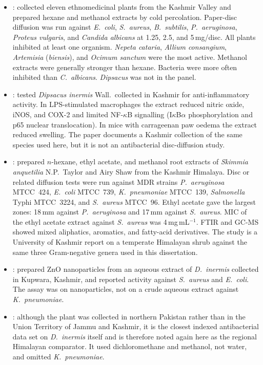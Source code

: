 \begin{itemize}

\item \citet{guna2018}: collected eleven ethnomedicinal plants from the Kashmir Valley and prepared hexane and methanol extracts by cold percolation. Paper-disc diffusion was run against \textit{E.\ coli}, \textit{S.\ aureus}, \textit{B.\ subtilis}, \textit{P.\ aeruginosa}, \textit{Proteus vulgaris}, and \textit{Candida albicans} at 1.25, 2.5, and 5\,mg/disc. All plants inhibited at least one organism. \textit{Nepeta cataria}, \textit{Allium consangium}, \textit{Artemisia} (\textit{biensis}), and \textit{Ocimum sanctum} were the most active. Methanol extracts were generally stronger than hexane. Bacteria were more often inhibited than \textit{C.\ albicans}. \textit{Dipsacus} was not in the panel.

\item \citet{hassan2020}: tested \textit{Dipsacus inermis} Wall.\ collected in Kashmir for anti-inflammatory activity. In LPS-stimulated macrophages the extract reduced nitric oxide, iNOS, and COX-2 and limited NF-$\kappa$B signalling (I$\kappa$B$\alpha$ phosphorylation and p65 nuclear translocation). In mice with carrageenan paw oedema the extract reduced swelling. The paper documents a Kashmir collection of the same species used here, but it is not an antibacterial disc-diffusion study.

\item \citet{nabi2022}: prepared $n$-hexane, ethyl acetate, and methanol root extracts of \textit{Skimmia anquetilia} N.P.\ Taylor and Airy Shaw from the Kashmir Himalaya. Disc or related diffusion tests were run against MDR strains \textit{P.\ aeruginosa} MTCC~424, \textit{E.\ coli} MTCC~739, \textit{K.\ pneumoniae} MTCC~139, \textit{Salmonella} Typhi MTCC~3224, and \textit{S.\ aureus} MTCC~96. Ethyl acetate gave the largest zones: 18\,mm against \textit{P.\ aeruginosa} and 17\,mm against \textit{S.\ aureus}. MIC of the ethyl acetate extract against \textit{S.\ aureus} was 4\,mg\,mL$^{-1}$. FTIR and GC-MS showed mixed aliphatics, aromatics, and fatty-acid derivatives. The study is a University of Kashmir report on a temperate Himalayan shrub against the same three Gram-negative genera used in this dissertation.

\item \citet{ji2026}: prepared ZnO nanoparticles from an aqueous extract of \textit{D.\ inermis} collected in Kupwara, Kashmir, and reported activity against \textit{S.\ aureus} and \textit{E.\ coli}. The assay was on nanoparticles, not on a crude aqueous extract against \textit{K.\ pneumoniae}.

\item \citet{drakhshaan2026}: although the plant was collected in northern Pakistan rather than in the Union Territory of Jammu and Kashmir, it is the closest indexed antibacterial data set on \textit{D.\ inermis} itself and is therefore noted again here as the regional Himalayan comparator. It used dichloromethane and methanol, not water, and omitted \textit{K.\ pneumoniae}.

\end{itemize}

